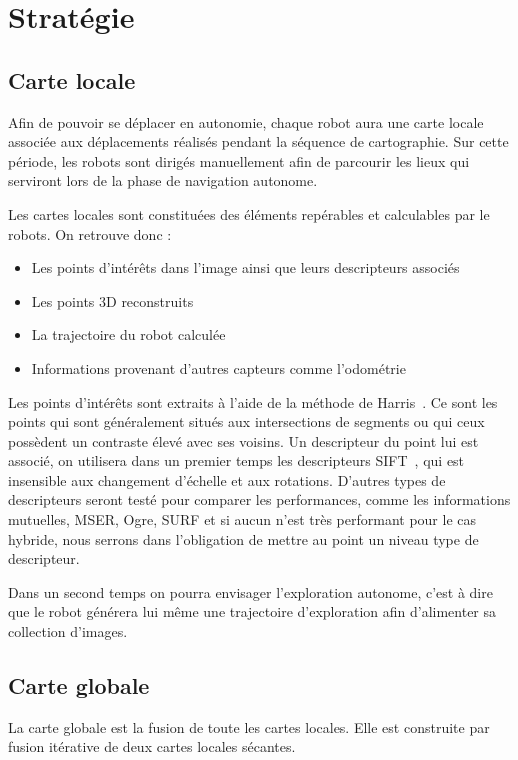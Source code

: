 \section{Stratégie}
\label{sec:strategie}

\subsection{Carte locale}

Afin de pouvoir se déplacer en autonomie, chaque robot aura une carte locale associée aux déplacements réalisés pendant la séquence de cartographie.
Sur cette période, les robots sont dirigés manuellement afin de parcourir les lieux qui serviront lors de la phase de navigation autonome.

Les cartes locales sont constituées des éléments repérables et calculables par le robots.
On retrouve donc :
\begin{itemize}
\item Les points d'intérêts dans l'image ainsi que leurs descripteurs associés
\item Les points 3D reconstruits
\item La trajectoire du robot calculée
\item Informations provenant d'autres capteurs comme l'odométrie
\end{itemize}

Les points d'intérêts sont extraits à l'aide de la méthode de Harris~\cite{Harris88}. Ce sont les points qui sont généralement situés aux intersections de segments ou qui ceux possèdent un contraste élevé avec ses voisins.
Un descripteur du point lui est associé, on utilisera dans un premier temps les descripteurs SIFT~\cite{Lowe99}, qui est insensible aux changement d'échelle et aux rotations.
D'autres types de descripteurs seront testé pour comparer les performances, comme les informations mutuelles, MSER, Ogre, SURF et si aucun n'est très performant pour le cas hybride, nous serrons dans l'obligation de mettre au point un niveau type de descripteur.

Dans un second temps on pourra envisager l'exploration autonome, c'est à dire que le robot générera lui même une trajectoire d'exploration afin d'alimenter sa collection d'images.

\subsection{Carte globale}

La carte globale est la fusion de toute les cartes locales.
Elle est construite par fusion itérative de deux cartes locales sécantes.

